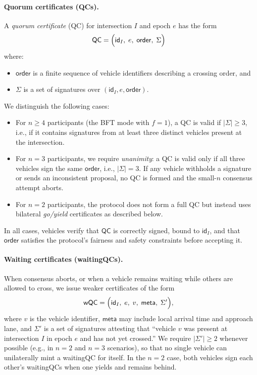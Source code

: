 \documentclass[fleqn,10pt]{olplainarticle}
\begin{document}
\paragraph{Quorum certificates (QCs).}
A \emph{quorum certificate} (QC) for intersection $I$ and epoch $e$ has the form
\[
  \mathsf{QC} = \Bigl(\mathsf{id}_I,\; e,\; \mathsf{order},\; \Sigma\Bigr)
\]
where:
\begin{itemize}
  \item $\mathsf{order}$ is a finite sequence of vehicle identifiers describing a crossing order, and
  \item $\Sigma$ is a set of signatures over $(\mathsf{id}_I, e, \mathsf{order})$.
\end{itemize}
We distinguish the following cases:
\begin{itemize}
  \item For $n \ge 4$ participants (the BFT mode with $f=1$), a QC is valid if $|\Sigma| \ge 3$, i.e., if it contains signatures from at least three distinct vehicles present at the intersection.
  \item For $n = 3$ participants, we require \emph{unanimity}: a QC is valid only if all three vehicles sign the same $\mathsf{order}$, i.e., $|\Sigma| = 3$. If any vehicle withholds a signature or sends an inconsistent proposal, no QC is formed and the small-$n$ consensus attempt aborts.
  \item For $n = 2$ participants, the protocol does not form a full QC but instead uses bilateral \emph{go/yield} certificates as described below.
\end{itemize}
In all cases, vehicles verify that $\mathsf{QC}$ is correctly signed, bound to $\mathsf{id}_I$, and that $\mathsf{order}$ satisfies the protocol's fairness and safety constraints before accepting it.

\paragraph{Waiting certificates (waitingQCs).}
When consensus aborts, or when a vehicle remains waiting while others are allowed to cross, we issue weaker certificates of the form
\[
  \mathsf{wQC} = \Bigl(\mathsf{id}_I,\; e,\; v,\; \mathsf{meta},\; \Sigma'\Bigr),
\]
where $v$ is the vehicle identifier, $\mathsf{meta}$ may include local arrival time and approach lane, and $\Sigma'$ is a set of signatures attesting that ``vehicle $v$ was present at intersection $I$ in epoch $e$ and has not yet crossed.'' We require $|\Sigma'| \ge 2$ whenever possible (e.g., in $n=2$ and $n=3$ scenarios), so that no single vehicle can unilaterally mint a waitingQC for itself. In the $n=2$ case, both vehicles sign each other's waitingQCs when one yields and remains behind.
\end{document}
